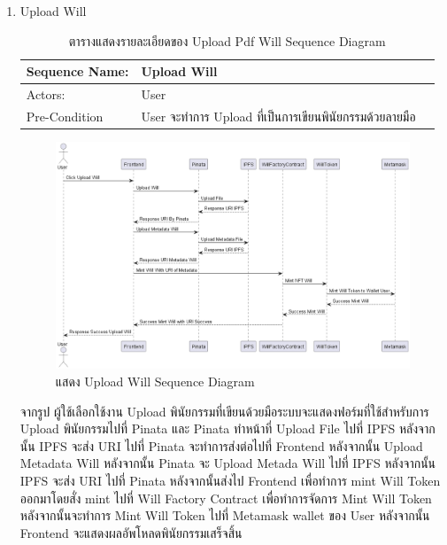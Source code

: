 \documentclass[12pt,oneside,openright,a4paper]{cpe-thai-project}
\begin{document}
\begin{enumerate}[label=\thesubsection.\arabic*,leftmargin=0pt,itemindent=1.25cm]
\clearpage
\item Upload Will
		\begin{table}[h]
		\centering
		\caption{ตารางแสดงรายละเอียดของ Upload Pdf Will Sequence Diagram}
		\begin{tabularx}{\textwidth}{|l|X|X|} 
			\hline
			Sequence Name: & Upload Will                                             \\ 
			\hline
			Actors:        & User                                                        \\ 
			\hline
			Pre-Condition  & User จะทำการ Upload ที่เป็นการเขียนพินัยกรรมด้วยลายมือ  \\
			\hline
		\end{tabularx}
		\end{table}
		\begin{figure}[!thb]
			\centering
			\includegraphics[scale=0.4]{uploadWillseq}
			\caption{แสดง Upload Will Sequence Diagram}
		\end{figure}
		\FloatBarrier
	\tab จากรูป ผู้ใช้เลือกใช้งาน Upload พินัยกรรมที่เขียนด้วยมือระบบจะแสดงฟอร์มที่ใช้สำหรับการ Upload พินัยกรรมไปที่ Pinata และ Pinata ทำหน้าที่ Upload File ไปที่ IPFS หลังจากนั้น IPFS จะส่ง URI ไปที่ Pinata จะทำการส่งต่อไปที่ Frontend หลังจากนั้น Upload Metadata Will หลังจากนั้น Pinata จะ Upload Metada Will ไปที่ IPFS หลังจากนั้น IPFS จะส่ง URI ไปที่ Pinata หลังจากนั้นส่งไป Frontend เพื่อทำการ mint Will Token ออกมาโดยสั่ง mint ไปที่ Will Factory Contract เพื่อทำการจัดการ Mint Will Token หลังจากนั้นจะทำการ Mint Will Token ไปที่ Metamask wallet ของ User หลังจากนั้น Frontend จะแสดงผลอัพโหลดพินัยกรรมเสร็จสิ้น
	

\end{enumerate}
\end{document}
